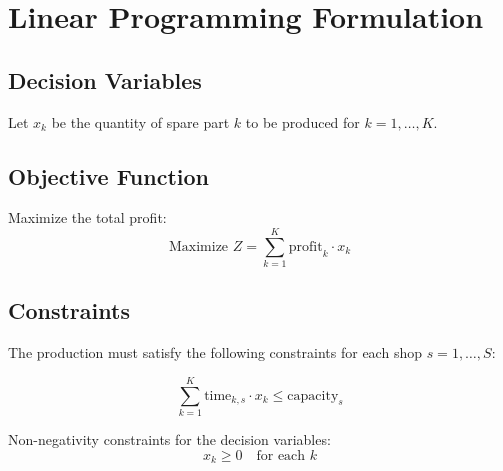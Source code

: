 \documentclass{article}
\begin{document}
\section*{Linear Programming Formulation}

\subsection*{Decision Variables}
Let \( x_k \) be the quantity of spare part \( k \) to be produced for \( k = 1, \ldots, K \).

\subsection*{Objective Function}
Maximize the total profit:
\[
\text{Maximize } Z = \sum_{k=1}^{K} \text{profit}_k \cdot x_k
\]

\subsection*{Constraints}
The production must satisfy the following constraints for each shop \( s = 1, \ldots, S \):

\[
\sum_{k=1}^{K} \text{time}_{k, s} \cdot x_k \leq \text{capacity}_s
\]

Non-negativity constraints for the decision variables:
\[
x_k \geq 0 \quad \text{for each } k
\]
\end{document}
